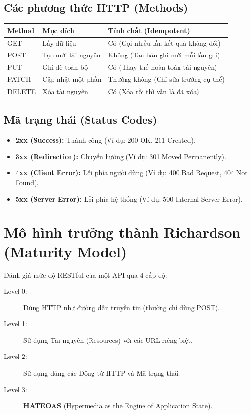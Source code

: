\documentclass[12pt]{article}
\begin{document}
\subsection{Các phương thức HTTP (Methods)}
\begin{center}
\begin{tabular}{|m{2cm}|m{5cm}|m{6cm}|}
    \hline
    \textbf{Method} & \textbf{Mục đích} & \textbf{Tính chất (Idempotent)} \\
    \hline
    GET & Lấy dữ liệu & Có (Gọi nhiều lần kết quả không đổi) \\
    \hline
    POST & Tạo mới tài nguyên & Không (Tạo bản ghi mới mỗi lần gọi) \\
    \hline
    PUT & Ghi đè toàn bộ & Có (Thay thế hoàn toàn tài nguyên) \\
    \hline
    PATCH & Cập nhật một phần & Thường không (Chỉ sửa trường cụ thể) \\
    \hline
    DELETE & Xóa tài nguyên & Có (Xóa rồi thì vẫn là đã xóa) \\
    \hline
\end{tabular}
\end{center}

\subsection{Mã trạng thái (Status Codes)}
\begin{itemize}
    \item \textbf{\color{blue}2xx (Success):} Thành công (Ví dụ: 200 OK, 201 Created).
    \item \textbf{\color{orange}3xx (Redirection):} Chuyển hướng (Ví dụ: 301 Moved Permanently).
    \item \textbf{\color{red}4xx (Client Error):} Lỗi phía người dùng (Ví dụ: 400 Bad Request, 404 Not Found).
    \item \textbf{\color{purple}5xx (Server Error):} Lỗi phía hệ thống (Ví dụ: 500 Internal Server Error).
\end{itemize}

\section{Mô hình trưởng thành Richardson (Maturity Model)}
Đánh giá mức độ RESTful của một API qua 4 cấp độ:
\begin{description}
    \item[Level 0:] Dùng HTTP như đường dẫn truyền tin (thường chỉ dùng POST).
    \item[Level 1:] Sử dụng Tài nguyên (Resources) với các URL riêng biệt.
    \item[Level 2:] Sử dụng đúng các Động từ HTTP và Mã trạng thái.
    \item[Level 3:] \textbf{HATEOAS} (Hypermedia as the Engine of Application State).
\end{description}
\end{document}

